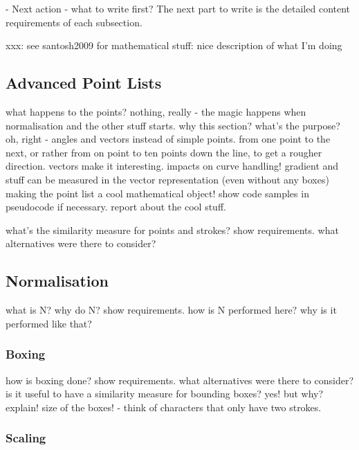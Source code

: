 - Next action - what to write first?
  The next part to write is the detailed content requirements of each subsection.

xxx: see santosh2009 for mathematical stuff: nice description of what I'm doing

\subsection{Advanced Point Lists}
\label{sec:hwre:advancedpointlists}

what happens to the points?
nothing, really - the magic happens when normalisation and the other stuff
starts.
why this section? what's the purpose? oh, right - angles and vectors instead
of simple points. from one point to the next, or rather from on point to
ten points down the line, to get a rougher direction.
vectors make it interesting. 
impacts on curve handling! gradient and stuff can be measured in the 
vector representation (even without any boxes)
making the point list a cool mathematical object!
show code samples in pseudocode if necessary.
report about the cool stuff.

what's the similarity measure for
points and strokes?
show requirements.
what alternatives were there to consider?

\subsection{Normalisation}
\label{sec:hwre:normalisation}

what is N?
why do N?
show requirements.
how is N performed here?
why is it performed like that?

\subsubsection{Boxing}
\label{sec:hwre:boxing}
how is boxing done?
show requirements.
what alternatives were there to consider?
is it useful to have a similarity measure for bounding boxes?
yes! but why? explain!
size of the boxes! - think of characters that only have two strokes.

\subsubsection{Scaling}
\label{sec:hwre:scaling}


